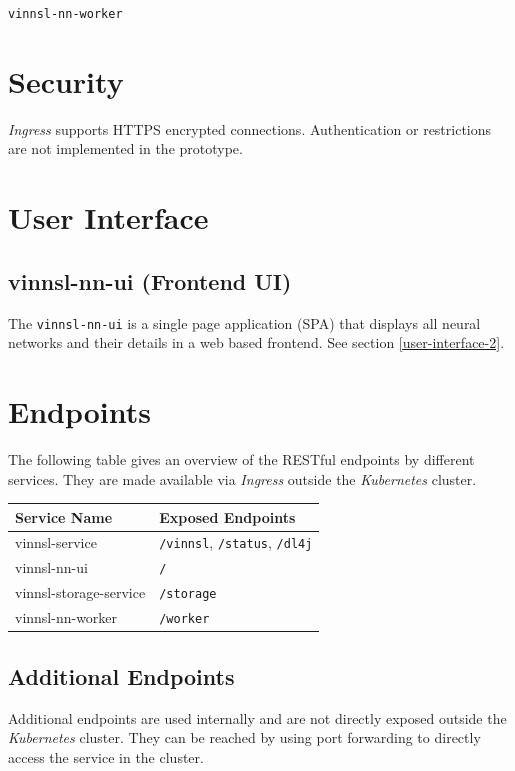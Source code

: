 \texttt{vinnsl-nn-worker}

\section{Security}\label{security}

\emph{Ingress} supports HTTPS encrypted connections. Authentication or
restrictions are not implemented in the prototype.

\section{User Interface}\label{user-interface-1}

\subsection{vinnsl-nn-ui (Frontend UI)}\label{vinnsl-nn-ui-frontend-ui}

The \texttt{vinnsl-nn-ui} is a single page application (SPA) that
displays all neural networks and their details in a web based frontend.
See section \ref{user-interface-2}.

\section{Endpoints}\label{endpoints}

The following table gives an overview of the RESTful endpoints by
different services. They are made available via \emph{Ingress} outside
the \emph{Kubernetes} cluster.

\begin{longtable}[]{@{}ll@{}}
\toprule
Service Name & Exposed Endpoints\tabularnewline
\midrule
\endhead
vinnsl-service & \texttt{/vinnsl}, \texttt{/status},
\texttt{/dl4j}\tabularnewline
vinnsl-nn-ui & \texttt{/}\tabularnewline
vinnsl-storage-service & \texttt{/storage}\tabularnewline
vinnsl-nn-worker & \texttt{/worker}\tabularnewline
\bottomrule
\end{longtable}

\subsection{Additional Endpoints}\label{additional-endpoints}

Additional endpoints are used internally and are not directly exposed
outside the \emph{Kubernetes} cluster. They can be reached by using port
forwarding to directly access the service in the cluster.

